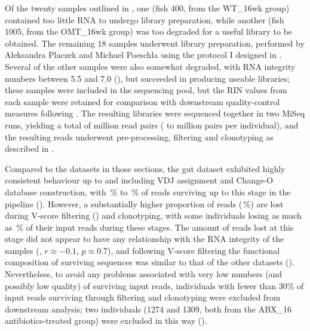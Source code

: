 Of the twenty samples outlined in , one (fish 400, from the WT\_16wk group) contained too little RNA to undergo \igseq library preparation, while another (fish 1005, from the OMT\_16wk group) was too degraded for a useful library to be obtained. The remaining 18 samples underwent \igseq library preparation, performed by Aleksandra Placzek and Michael Poeschla using the protocol I designed in . Several of the other samples were also somewhat degraded, with RNA integrity numbers between 5.5 and 7.0 (), but succeeded in producing useable libraries; these samples were included in the sequencing pool, but the RIN values from each sample were retained for comparison with downstream quality-control measures following \Igseq. The resulting libraries were sequenced together in two MiSeq runs, yielding a total of  million read pairs ( to  million pairs per individual), and the resulting reads underwent pre-processing, filtering and clonotyping as described in .

Compared to the datasets in those sections, the gut dataset exhibited highly consistent behaviour up to and including VDJ assignment and Change-O database construction, with \,\% to \,\% of reads surviving up to this stage in the pipeline (). However, a substantially higher proportion of reads (\,\%) are lost during V-score filtering () and clonotyping, with some individuals losing as much as \,\% of their input reads during these stages. The amount of reads lost at this stage did not appear to have any relationship with the RNA integrity of the samples (, $r \approx -0.1$, $p \approx 0.7$), and following V-score filtering the functional composition of surviving sequences was similar to that of the other datasets (). Nevertheless, to avoid any problems associated with very low numbers (and possibly low quality) of surviving input reads, individuals with fewer than 30\% of input reads surviving through filtering and clonotyping were excluded from downstream analysis; two individuals (1274 and 1309, both from the ABX\_16 antibiotics-treated group) were excluded in this way ().

